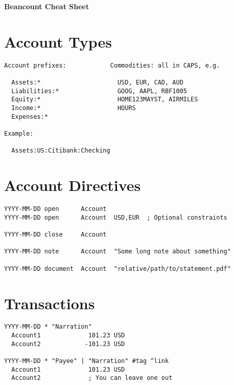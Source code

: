 \documentclass[10pt,landscape]{article}
\begin{document}
\begin{center}
  \Large{\textbf{Beancount Cheat Sheet}}
\end{center}
\vspace{1em}


\raggedright
\footnotesize
\begin{multicols}{2}

\setlength{\premulticols}{1pt}
\setlength{\postmulticols}{1pt}
\setlength{\multicolsep}{1pt}
\setlength{\columnsep}{2pt}


\section{Account Types}
\begin{verbatim}
Account prefixes:            Commodities: all in CAPS, e.g.

  Assets:*                     USD, EUR, CAD, AUD
  Liabilities:*                GOOG, AAPL, RBF1005
  Equity:*                     HOME123MAYST, AIRMILES
  Income:*                     HOURS
  Expenses:*

Example:

  Assets:US:Citibank:Checking
\end{verbatim}



\section{Account Directives}
\begin{verbatim}
YYYY-MM-DD open      Account
YYYY-MM-DD open      Account  USD,EUR  ; Optional constraints
                     
YYYY-MM-DD close     Account
                     
YYYY-MM-DD note      Account  "Some long note about something"
                     
YYYY-MM-DD document  Account  "relative/path/to/statement.pdf"
\end{verbatim}



\section{Transactions}
\begin{verbatim}
YYYY-MM-DD * "Narration"
  Account1             101.23 USD
  Account2            -101.23 USD

YYYY-MM-DD * "Payee" | "Narration" #tag ^link
  Account1             101.23 USD
  Account2             ; You can leave one out
\end{verbatim}


\end{multicols}
\end{document}

